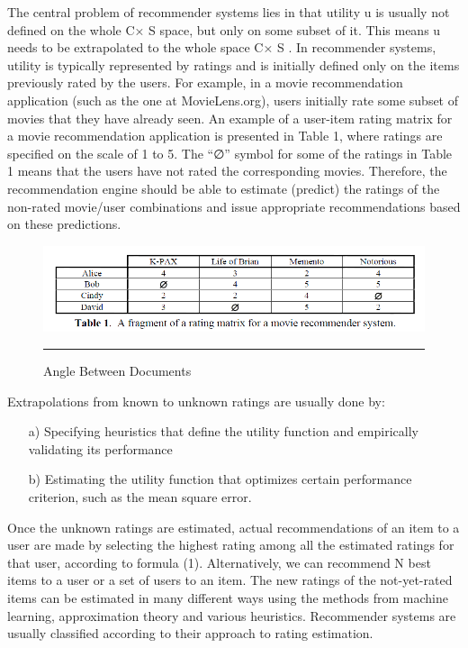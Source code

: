The central problem of recommender systems lies in that utility u is usually not defined on the whole C× S space, but only on some subset of it. This means u needs to be extrapolated to the whole space C× S . In recommender systems, utility is typically represented by ratings and is initially defined only on the items previously rated by the users. For example, in a movie recommendation application (such as the one at MovieLens.org), users initially rate some subset of movies that they have already seen. An example of a user-item rating matrix for a movie recommendation application is presented in Table 1, where ratings are specified on the scale of 1 to 5. The “∅” symbol for some of the ratings in Table 1 means that the users have not rated the corresponding movies. Therefore, the recommendation engine should be able to estimate (predict) the ratings of the non-rated movie/user combinations and issue appropriate recommendations based on these predictions.
\begin{figure}[htbp]
	\centering
		\includegraphics{./Figures/Capture.PNG}
		\rule{35em}{0.5pt}
	\caption[Angle Between Documents]{Angle Between Documents}
	\label{fig:Angle Between Documents}
\end{figure}

Extrapolations from known to unknown ratings are usually done by:
\begin{itemize}
\item [a)] Specifying heuristics that define the utility function and empirically validating its performance
\item [b)] Estimating the utility function that optimizes certain performance criterion, such as the mean square error.
\end{itemize}

Once the unknown ratings are estimated, actual recommendations of an item to a user are made by selecting the highest rating among all the estimated ratings for that user, according to formula (1). Alternatively, we can recommend N best items to a user or a set of users to an item.
The new ratings of the not-yet-rated items can be estimated in many different ways using the methods from machine learning, approximation theory and various heuristics. Recommender systems are usually classified according to their approach to rating estimation.

